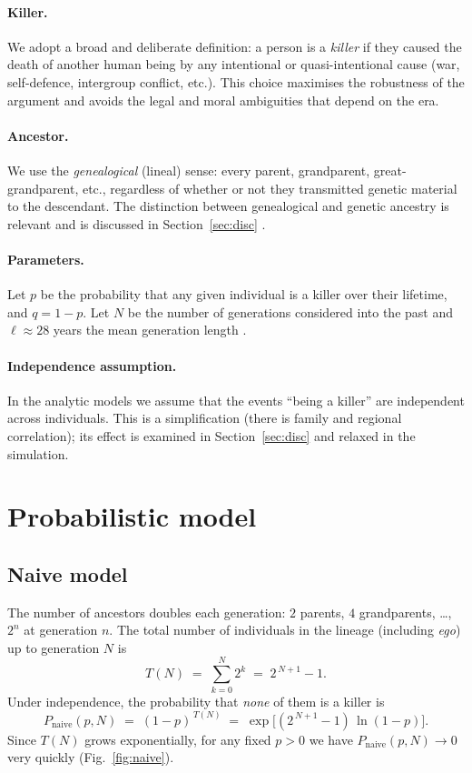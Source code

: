 \documentclass[11pt]{article}
\begin{document}
\paragraph{Killer.} We adopt a broad and deliberate definition: a person is a
\emph{killer} if they caused the death of another human being by any intentional
or quasi-intentional cause (war, self-defence, intergroup conflict, etc.). This
choice maximises the robustness of the argument and avoids the legal and moral
ambiguities that depend on the era.

\paragraph{Ancestor.} We use the \emph{genealogical} (lineal) sense: every
parent, grandparent, great-grandparent, etc., regardless of whether or not they
transmitted genetic material to the descendant. The distinction between
genealogical and genetic ancestry is relevant and is discussed in
Section~\ref{sec:disc} \citep{ralph2013}.

\paragraph{Parameters.} Let $p$ be the probability that any given individual is a
killer over their lifetime, and $q = 1-p$. Let $N$ be the number of generations
considered into the past and $\ell \approx 28$ years the mean generation length
\citep{fenner2005}.

\paragraph{Independence assumption.} In the analytic models we assume that the
events ``being a killer'' are independent across individuals. This is a
simplification (there is family and regional correlation); its effect is examined
in Section~\ref{sec:disc} and relaxed in the simulation.

\section{Probabilistic model}

\subsection{Naive model}

The number of ancestors doubles each generation: $2$ parents, $4$ grandparents,
\dots, $2^n$ at generation $n$. The total number of individuals in the lineage
(including \emph{ego}) up to generation $N$ is
\begin{equation}
  T(N) \;=\; \sum_{k=0}^{N} 2^k \;=\; 2^{\,N+1}-1 .
\end{equation}
Under independence, the probability that \emph{none} of them is a killer is
\begin{equation}\label{eq:naive}
  P_{\text{naive}}(p,N) \;=\; (1-p)^{\,T(N)} \;=\;
  \exp\!\big[(2^{\,N+1}-1)\,\ln(1-p)\big].
\end{equation}
Since $T(N)$ grows exponentially, for any fixed $p>0$ we have
$P_{\text{naive}}(p,N)\to 0$ very quickly (Fig.~\ref{fig:naive}).
\end{document}
